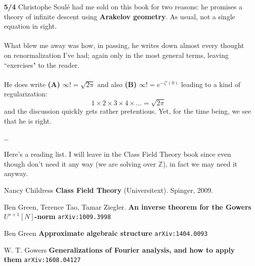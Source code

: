 \documentclass[12pt]{article}
\begin{document}
\newpage 

\noindent \textbf{5/4} Christophe Soul\'{e} had me sold on this book for two reasons:  he promises a theory of infinite descent using \textbf{Arakelov geometry}.  As usual, not a single equation in sight. \\ \\
What blew me away was how, in passing, he writes down almost every thought on renormalization I've had; again only in the most general terms, leaving ``exercises" to the reader. \\ \\
He does write \textbf{(A)} $\infty ! = \sqrt{2\pi}$ and also \textbf{(B)} $\infty! = e^{-\zeta'(0)} $ leading to a kind of regularization:
$$ 1 \times 2 \times 3 \times 4 \times \dots = \sqrt{2\pi} $$
and the discussion quickly gets rather pretentious.  Yet, for the time being, we see that he is right.

\newpage

\dots

\vfill


\noindent Here's a reading list. I will leave in the Class Field Theory book since even though don't need it any way (we are solving over $\mathbb{Z}$), in fact we may need it anyway.

\begin{thebibliography}{}

\item Nancy Childress \textbf{Class Field Theory} (Universitext).  Spinger, 2009.

\item Ben Green, Terence Tao, Tamar Ziegler. \textbf{An inverse theorem for the Gowers $U^{s+1}[N]$-norm} \texttt{arXiv:1009.3998}

\item Ben Green \textbf{Approximate algebraic structure} \texttt{arXiv:1404.0093}

\item W. T. Gowers \textbf{Generalizations of Fourier analysis, and how to apply them} \texttt{arXiv:1608.04127}

\end{thebibliography}

\end{document}
